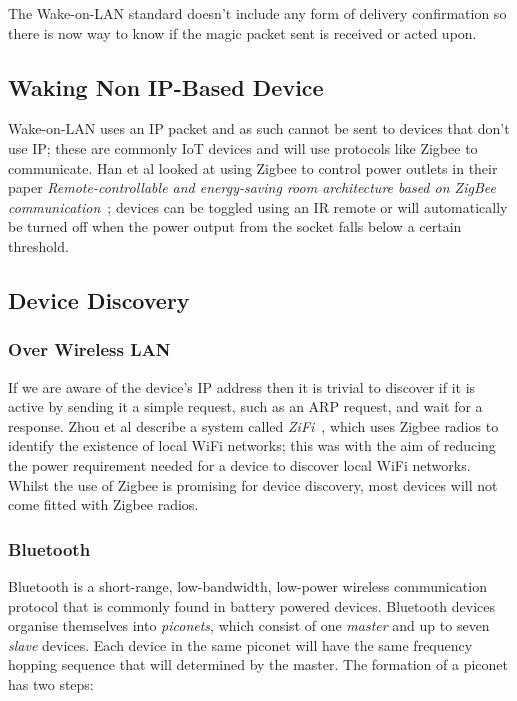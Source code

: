 The Wake-on-LAN standard doesn't include any form of delivery confirmation so there is now way to know if the magic packet sent is received or acted upon. 

\subsection{Waking Non IP-Based Device}

Wake-on-LAN uses an IP packet and as such cannot be sent to devices that don't use IP; these are commonly IoT devices and will use protocols like Zigbee to communicate. Han et al looked at using Zigbee to control power outlets in their paper \textit{Remote-controllable and energy-saving room architecture based on ZigBee communication}~\cite{han_remote-controllable_2009}; devices can be toggled using an IR remote or will automatically be turned off when the power output from the socket falls below a certain threshold.

\subsection{Device Discovery}

\vspace{2mm}
\subsubsection{Over Wireless LAN}

If we are aware of the device's IP address then it is trivial to discover if it is active by sending it a simple request, such as an ARP request, and wait for a response.
\x
Zhou et al describe a system called \textit{ZiFi}~\cite{zhou_zifi_2010}, which uses Zigbee radios to identify the existence of local WiFi networks; this was with the aim of reducing the power requirement needed for a device to discover local WiFi networks. Whilst the use of Zigbee is promising for device discovery, most devices will not come fitted with Zigbee radios. 

\vspace{2mm}
\subsubsection{Bluetooth}

Bluetooth is a short-range, low-bandwidth, low-power wireless communication protocol that is commonly found in battery powered devices. Bluetooth devices organise themselves into \textit{piconets}, which consist of one \textit{master} and up to seven \textit{slave} devices. Each device in the same piconet will have the same frequency hopping sequence that will determined by the master. The formation of a piconet has two steps:

